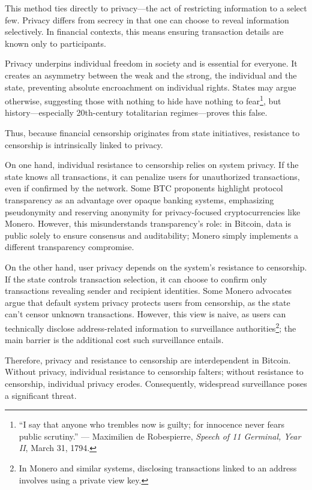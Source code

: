 \documentclass[
  a5paper,
  smalldemyvopaper,10pt,twoside,onecolumn,openright,extrafontsizes,hidelinks]{memoir}
\begin{document}
This method ties directly to privacy---the act of restricting
information to a select few. Privacy differs from secrecy in that one
can choose to reveal information selectively. In financial contexts,
this means ensuring transaction details are known only to participants.

Privacy underpins individual freedom in society and is essential for
everyone. It creates an asymmetry between the weak and the strong, the
individual and the state, preventing absolute encroachment on individual
rights. States may argue otherwise, suggesting those with nothing to
hide have nothing to fear\footnote{``I say that anyone who trembles now
  is guilty; for innocence never fears public scrutiny.'' --- Maximilien
  de Robespierre, \emph{Speech of 11 Germinal, Year II}, March 31, 1794.},
but history---especially 20th-century totalitarian regimes---proves this
false.

Thus, because financial censorship originates from state initiatives,
resistance to censorship is intrinsically linked to privacy.

On one hand, individual resistance to censorship relies on system
privacy. If the state knows all transactions, it can penalize users for
unauthorized transactions, even if confirmed by the network. Some BTC
proponents highlight protocol transparency as an advantage over opaque
banking systems, emphasizing pseudonymity and reserving anonymity for
privacy-focused cryptocurrencies like Monero. However, this
misunderstands transparency's role: in Bitcoin, data is public solely to
ensure consensus and auditability; Monero simply implements a different
transparency compromise.

On the other hand, user privacy depends on the system's resistance to
censorship. If the state controls transaction selection, it can choose
to confirm only transactions revealing sender and recipient identities.
Some Monero advocates argue that default system privacy protects users
from censorship, as the state can't censor unknown transactions.
However, this view is naive, as users can technically disclose
address-related information to surveillance authorities\footnote{In
  Monero and similar systems, disclosing transactions linked to an
  address involves using a private view key.}; the main barrier is the
additional cost such surveillance entails.

Therefore, privacy and resistance to censorship are interdependent in
Bitcoin. Without privacy, individual resistance to censorship falters;
without resistance to censorship, individual privacy erodes.
Consequently, widespread surveillance poses a significant threat.
\end{document}
